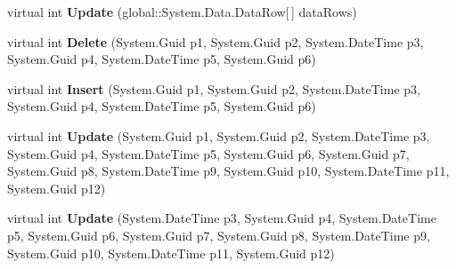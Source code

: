 \begin{DoxyCompactItemize}
\item 
virtual int {\bfseries Update} (global\+::\+System.\+Data.\+Data\+Row\mbox{[}$\,$\mbox{]} data\+Rows)\hypertarget{class_products_1_1_data_1_1ds_sage_table_adapters_1_1ta_tour_interessent_xref_a550ee7a77c9a6c1c87a932e04cc58117}{}\label{class_products_1_1_data_1_1ds_sage_table_adapters_1_1ta_tour_interessent_xref_a550ee7a77c9a6c1c87a932e04cc58117}

\item 
virtual int {\bfseries Delete} (System.\+Guid p1, System.\+Guid p2, System.\+Date\+Time p3, System.\+Guid p4, System.\+Date\+Time p5, System.\+Guid p6)\hypertarget{class_products_1_1_data_1_1ds_sage_table_adapters_1_1ta_tour_interessent_xref_a43ce4bea62e535220487a85f5e7751e7}{}\label{class_products_1_1_data_1_1ds_sage_table_adapters_1_1ta_tour_interessent_xref_a43ce4bea62e535220487a85f5e7751e7}

\item 
virtual int {\bfseries Insert} (System.\+Guid p1, System.\+Guid p2, System.\+Date\+Time p3, System.\+Guid p4, System.\+Date\+Time p5, System.\+Guid p6)\hypertarget{class_products_1_1_data_1_1ds_sage_table_adapters_1_1ta_tour_interessent_xref_a3f3fa94d29dff2e699179b705edc9e8a}{}\label{class_products_1_1_data_1_1ds_sage_table_adapters_1_1ta_tour_interessent_xref_a3f3fa94d29dff2e699179b705edc9e8a}

\item 
virtual int {\bfseries Update} (System.\+Guid p1, System.\+Guid p2, System.\+Date\+Time p3, System.\+Guid p4, System.\+Date\+Time p5, System.\+Guid p6, System.\+Guid p7, System.\+Guid p8, System.\+Date\+Time p9, System.\+Guid p10, System.\+Date\+Time p11, System.\+Guid p12)\hypertarget{class_products_1_1_data_1_1ds_sage_table_adapters_1_1ta_tour_interessent_xref_aff897af32a00df13a2675e6783e0786e}{}\label{class_products_1_1_data_1_1ds_sage_table_adapters_1_1ta_tour_interessent_xref_aff897af32a00df13a2675e6783e0786e}

\item 
virtual int {\bfseries Update} (System.\+Date\+Time p3, System.\+Guid p4, System.\+Date\+Time p5, System.\+Guid p6, System.\+Guid p7, System.\+Guid p8, System.\+Date\+Time p9, System.\+Guid p10, System.\+Date\+Time p11, System.\+Guid p12)\hypertarget{class_products_1_1_data_1_1ds_sage_table_adapters_1_1ta_tour_interessent_xref_a573b8089fabb86790081fb37bf82bf78}{}\label{class_products_1_1_data_1_1ds_sage_table_adapters_1_1ta_tour_interessent_xref_a573b8089fabb86790081fb37bf82bf78}

\end{DoxyCompactItemize}
